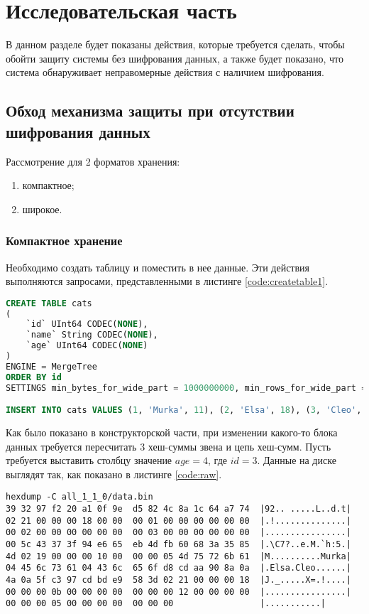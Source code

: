 \section{Исследовательская часть}

В данном разделе будет показаны действия, которые требуется сделать, чтобы обойти защиту системы без шифрования данных, а также будет показано, что система обнаруживает неправомерные действия с наличием шифрования.

\subsection{Обход механизма защиты при отсутствии шифрования данных}

Рассмотрение для 2 форматов хранения:
\begin{enumerate}
    \item компактное;
    \item широкое.
\end{enumerate}

\subsubsection{Компактное хранение}

Необходимо создать таблицу и поместить в нее данные. Эти действия выполняются запросами, представленными в листинге \ref{code:createtable1}.

\begin{lstlisting}[language=sql, label=code:createtable1, caption={Создание таблицы с компактным хранением.}]
CREATE TABLE cats
(
    `id` UInt64 CODEC(NONE),
    `name` String CODEC(NONE),
    `age` UInt64 CODEC(NONE)
)
ENGINE = MergeTree
ORDER BY id
SETTINGS min_bytes_for_wide_part = 1000000000, min_rows_for_wide_part = 1000000000, use_parts_chainer = 1

INSERT INTO cats VALUES (1, 'Murka', 11), (2, 'Elsa', 18), (3, 'Cleo', 5)
\end{lstlisting}

Как было показано в конструкторской части, при изменении какого-то блока данных требуется пересчитать 3 хеш-суммы звена и цепь хеш-сумм. Пусть требуется выставить столбцу значение $age = 4$, где $id = 3$. Данные на диске выглядят так, как показано в листинге \ref{code:raw}.

\pagebreak

\begin{lstlisting}[label=code:raw, caption={Данные записанного звена в сыром виде.}]
hexdump -C all_1_1_0/data.bin
39 32 97 f2 20 a1 0f 9e  d5 82 4c 8a 1c 64 a7 74  |92.. .....L..d.t|
02 21 00 00 00 18 00 00  00 01 00 00 00 00 00 00  |.!..............|
00 02 00 00 00 00 00 00  00 03 00 00 00 00 00 00  |................|
00 5c 43 37 3f 94 e6 65  eb 4d fb 60 68 3a 35 85  |.\C7?..e.M.`h:5.|
4d 02 19 00 00 00 10 00  00 00 05 4d 75 72 6b 61  |M..........Murka|
04 45 6c 73 61 04 43 6c  65 6f d8 cd aa 90 8a 0a  |.Elsa.Cleo......|
4a 0a 5f c3 97 cd bd e9  58 3d 02 21 00 00 00 18  |J._.....X=.!....|
00 00 00 0b 00 00 00 00  00 00 00 12 00 00 00 00  |................|
00 00 00 05 00 00 00 00  00 00 00                 |...........|
\end{lstlisting}


